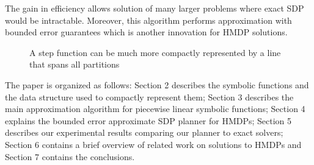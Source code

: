 The gain in efficiency allows solution of many larger problems where exact SDP would be intractable. Moreover, this algorithm performs approximation with bounded error guarantees which is another innovation for HMDP solutions.

\begin{figure}[!ht]
\centering
\begin{minipage}{.3\textwidth}
  \centering
\end{minipage}
\begin{minipage}{.3\textwidth}
\centering
{}
\end{minipage}
\caption{A step function can be much more compactly represented by a line that spans all partitions}
 \label{stepfunfig}
\end{figure}

The paper is organized as follows: Section 2 describes the symbolic functions and the data structure used to compactly represent them; Section 3 describes the main approximation algorithm for piecewise linear symbolic functions; Section 4 explains the bounded error approximate SDP planner for HMDPs; Section 5 describes our experimental results comparing our planner to exact solvers; Section 6 contains a brief overview of related work on solutions to HMDPs and Section 7 contains the conclusions.
